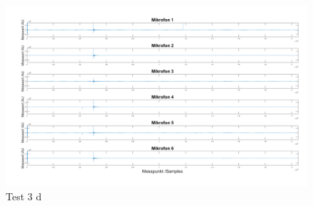\begin{figure}[h]
	\begin{center}
		\includegraphics[width=\textwidth]{Sections/Programmierung/Test_3_d}
	\end{center}
	\caption{Test 3 d}
	\label{fig:Test_3_d}
\end{figure}

\newpage